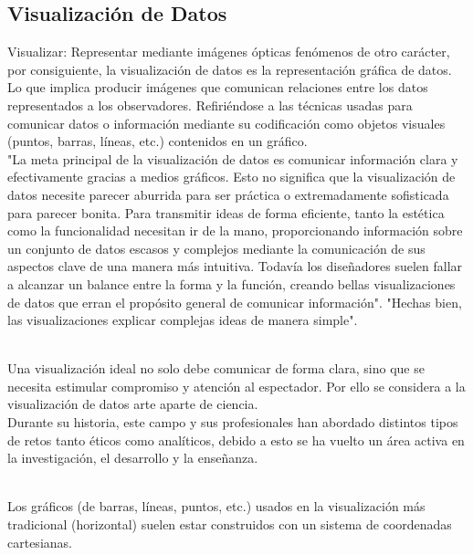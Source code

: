 \documentclass{article}\usepackage[]{graphicx}\usepackage[]{color}
\begin{document}
\subsection{Visualizaci\'on de Datos}\label{ssec:visua}
Visualizar: Representar mediante im\'agenes \'opticas fen\'omenos de otro car\'acter\cite{rae}, por consiguiente, la visualizaci\'on de datos es la representaci\'on gr\'afica de datos. Lo que implica producir im\'agenes que comunican relaciones entre los datos representados a los observadores. Refiri\'endose a las t\'ecnicas usadas para comunicar datos o informaci\'on mediante su codificaci\'on como objetos visuales (puntos, barras, l\'ineas, etc.) contenidos en un gr\'afico.~\\
"La meta principal de la visualizaci\'on de datos es comunicar informaci\'on clara y efectivamente gracias a medios gr\'aficos. Esto no significa que la visualizaci\'on de datos necesite parecer aburrida para ser pr\'actica o extremadamente sofisticada para parecer bonita. Para transmitir ideas de forma eficiente, tanto la est\'etica como la funcionalidad necesitan ir de la mano, proporcionando informaci\'on sobre un conjunto de datos escasos y complejos mediante la comunicaci\'on de sus aspectos clave de una manera m\'as intuitiva. Todav\'ia los dise\~nadores suelen fallar a alcanzar un balance entre la forma y la funci\'on, creando bellas visualizaciones de datos que erran el prop\'osito general de comunicar informaci\'on"\cite[Vitaly Friedman]{vitaly}. "Hechas bien, las visualizaciones explicar complejas ideas de manera simple"\cite[Thomas Powell, CEO de ZingChart]{zingchart}.~\\~\par
Una visualizaci\'on ideal no solo debe comunicar de forma clara, sino que se necesita estimular compromiso y atenci\'on al espectador\cite{sexy}. Por ello se considera a la visualizaci\'on de datos arte aparte de ciencia\cite{moma}\cite{art}.~\\
Durante su historia, este campo y sus profesionales han abordado distintos tipos de retos tanto \'eticos como anal\'iticos\cite{history}, debido a esto se ha vuelto un \'area activa en la investigaci\'on, el desarrollo y la ense\~nanza\cite{articulos}.~\\~\par
Los gr\'aficos (de barras, l\'ineas, puntos, etc.) usados en la visualizaci\'on m\'as tradicional (horizontal) suelen estar construidos con un sistema de coordenadas cartesianas\cite{coord_carte}.~\\
\end{document}
